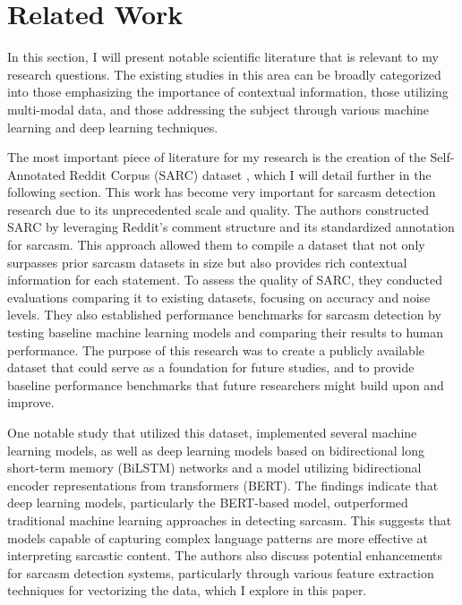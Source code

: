 \section{Related Work}

In this section, I will present notable scientific literature that is relevant to my research questions. 
The existing studies in this area can be broadly categorized into those emphasizing the importance of contextual information, 
those utilizing multi-modal data, and those addressing the subject through various machine learning and deep learning techniques.

The most important piece of literature for my research is the creation of the Self-Annotated Reddit Corpus (SARC) dataset \cite{SARC}, which I will detail further in the following section. 
This work has become very important for sarcasm detection research due to its unprecedented scale and quality. The authors constructed SARC by leveraging Reddit's comment structure and its 
standardized annotation for sarcasm. This approach allowed them to compile a dataset that not only surpasses prior sarcasm datasets in size but also provides rich contextual information for 
each statement. To assess the quality of SARC, they conducted evaluations comparing it to existing datasets, focusing on accuracy and noise levels. They also established performance benchmarks 
for sarcasm detection by testing baseline machine learning models and comparing their results to human performance. The purpose of this research was to create a publicly available dataset that 
could serve as a foundation for future studies, and to provide baseline performance benchmarks that future researchers might build upon and improve.

One notable study \cite{Sandor_2024} that utilized this dataset, implemented several machine learning models, as well as deep learning models based on bidirectional long short-term memory (BiLSTM) 
networks and a model utilizing bidirectional encoder representations from transformers (BERT). The findings indicate that deep learning models, particularly the BERT-based model, outperformed 
traditional machine learning approaches in detecting sarcasm. This suggests that models capable of capturing complex language patterns are more effective at interpreting sarcastic content. 
The authors also discuss potential enhancements for sarcasm detection systems, particularly through various feature extraction techniques for vectorizing the data, which I explore in this paper.

